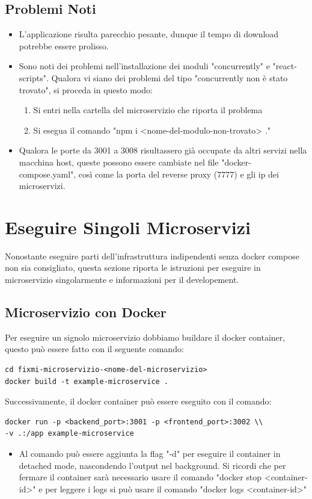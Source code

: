 \documentclass{report}
\begin{document}
\subsection*{Problemi Noti}
\begin{itemize}
	\item L'applicazione risulta parecchio pesante, dunque il tempo di download potrebbe essere prolisso.
	\item Sono noti dei problemi nell'installazione dei moduli "concurrently" e "react-scripts". Qualora vi siano dei problemi del tipo "concurrently non è stato trovato", si proceda in questo modo:
	      \begin{enumerate}
		      \item Si entri nella cartella del microservizio che riporta il problema
		      \item Si esegua il comando "npm i <nome-del-modulo-non-trovato> ."
	      \end{enumerate}
	\item Qualora le porte da 3001 a 3008 risultassero già occupate da altri servizi nella macchina host, queste possono essere cambiate nel file "docker-compose.yaml", così come la porta del reverse proxy (7777) e gli ip dei microservizi.
\end{itemize}

\section{Eseguire Singoli Microservizi}
Nonostante eseguire parti dell'infrastruttura indipendenti senza docker compose non sia consigliato, questa sezione riporta le istruzioni per eseguire in microservizio singolarmente e informazioni per il developement.

\subsection*{Microservizio con Docker}
Per eseguire un signolo microservizio dobbiamo buildare il docker container, questo può essere fatto con il seguente comando:
\begin{verbatim}
cd fixmi-microservizio-<nome-del-microservizio>
docker build -t example-microservice .
\end{verbatim}
Successivamente, il docker container può essere eseguito con il comando:
\begin{verbatim}
docker run -p <backend_port>:3001 -p <frontend_port>:3002 \\
-v .:/app example-microservice
\end{verbatim}
\begin{itemize}
	\item Al comando può essere aggiunta la flag "-d" per eseguire il container in detached mode, nascondendo l'output nel background. Si ricordi che per fermare il container sarà necessario usare il comando "docker stop <container-id>" e per leggere i logs si può usare il comando "docker logs <container-id>"
\end{itemize}
\end{document}
